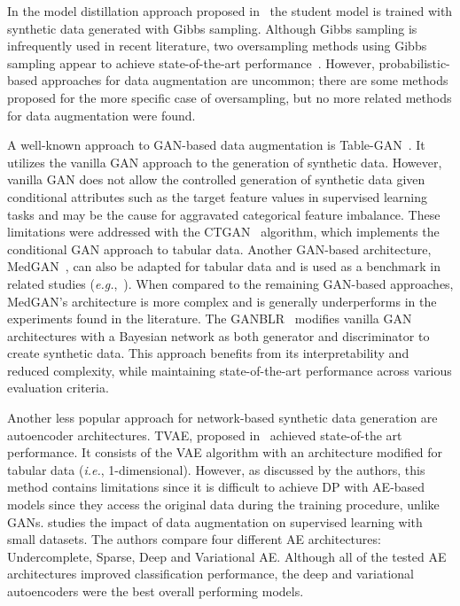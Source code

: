 \documentclass[parskip=full]{scrartcl}
\begin{document}
In the model distillation approach proposed in~\cite{fakoor2020fast} the
student model is trained with synthetic data generated with Gibbs sampling.
Although Gibbs sampling is infrequently used in recent literature, two
oversampling methods using Gibbs sampling appear to achieve state-of-the-art
performance~\cite{das2014racog}. However, probabilistic-based approaches for
data augmentation are uncommon; there are some methods proposed for the more
specific case of oversampling, but no more related methods for data
augmentation were found.

A well-known approach to GAN-based data augmentation is
Table-GAN~\cite{park2018data}. It utilizes the vanilla GAN approach to the
generation of synthetic data. However, vanilla GAN does not allow the
controlled generation of synthetic data given conditional attributes such as
the target feature values in supervised learning tasks and may be the cause
for aggravated categorical feature imbalance. These limitations were addressed
with the CTGAN~\cite{xu2019modeling} algorithm, which implements the
conditional GAN approach to tabular data. Another GAN-based architecture,
MedGAN~\cite{armanious2020medgan}, can also be adapted for tabular data and is
used as a benchmark in related studies (\textit{e.g.},~\cite{xu2019modeling,
zhang2021ganblr}). When compared to the remaining GAN-based approaches,
MedGAN's architecture is more complex and is generally underperforms in the
experiments found in the literature. The GANBLR~\cite{zhang2021ganblr}
modifies vanilla GAN architectures with a Bayesian network as both generator
and discriminator to create synthetic data. This approach benefits from its
interpretability and reduced complexity, while maintaining state-of-the-art
performance across various evaluation criteria.

Another less popular approach for network-based synthetic data generation are
autoencoder architectures. TVAE, proposed in~\cite{xu2019modeling} achieved
state-of-the art performance.  It consists of the VAE algorithm with an
architecture modified for tabular data (\textit{i.e.}, 1-dimensional).
However, as discussed by the authors, this method contains limitations since
it is difficult to achieve DP with AE-based models since they access the
original data during the training procedure, unlike GANs.
\citet{delgado2021deep} studies the impact of data augmentation on supervised
learning with small datasets. The authors compare four different AE
architectures: Undercomplete, Sparse, Deep and Variational AE\@. Although all
of the tested AE architectures improved classification performance, the deep
and variational autoencoders were the best overall performing models.
\end{document}
